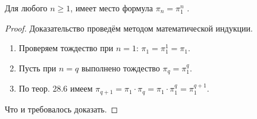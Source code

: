 \begin{theorem}
 	Для любого $n \geq 1$, имеет место формула $\pi_n = \pi_1^n$ .
 \end{theorem} 

\begin{proof}
Доказательство проведём методом математической индукции.
\begin{enumerate}
	\item Проверяем тождество при $n = 1$: $\pi_1 = \pi^1_1 = \pi_1$.
	\item Пусть при $n = q$ выполнено тождество $\pi_q = \pi_1^q .$
	\item По теор. 28.6 имеем $\pi_{q+1} = \pi_1 \cdot \pi_q = \pi_1 \cdot \pi_1^q = \pi_1^{q+1}$.
\end{enumerate}
Что и требовалось доказать.
\end{proof}